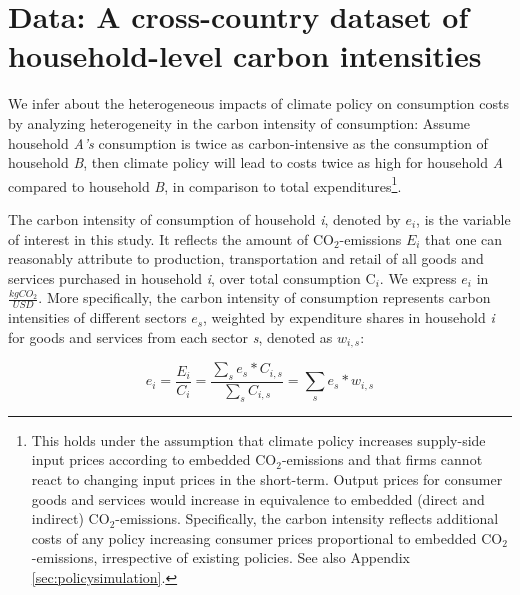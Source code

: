 \documentclass[12pt, a4paper]{article}
\begin{document}
\section{Data: A cross-country dataset of household-level carbon intensities} \label{sec:data}

We infer about the heterogeneous impacts of climate policy on consumption costs by analyzing heterogeneity in the carbon intensity of consumption: Assume household \textit{A's} consumption is twice as carbon-intensive as the consumption of household \textit{B}, then climate policy will lead to costs twice as high for household \textit{A} compared to household \textit{B}, in comparison to total expenditures\footnote{This holds under the assumption that climate policy increases supply-side input prices according to embedded CO$_{2}$-emissions and that firms cannot react to changing input prices in the short-term. Output prices for consumer goods and services would increase in equivalence to embedded (direct and indirect) CO$_{2}$-emissions. Specifically, the carbon intensity reflects additional costs of any policy increasing consumer prices proportional to embedded CO$_{2}$-emissions, irrespective of existing policies. See also Appendix \ref{sec:policysimulation}.}.

The carbon intensity of consumption of household \textit{i}, denoted by $e_{i}$, is the variable of interest in this study. It reflects the amount of CO$_{2}$-emissions $E_{i}$ that one can reasonably attribute to production, transportation and retail of all goods and services purchased in household \textit{i}, over total consumption C$_{i}$. We express $e_{i}$ in $\frac{kgCO_{2}}{USD}$. More specifically, the carbon intensity of consumption represents carbon intensities of different sectors $e_{s}$, weighted by expenditure shares in household \textit{i} for goods and services from each sector \textit{s}, denoted as $w_{i,s}$:


\begin{equation} \label{eq:ei}
e_{i} = \frac{E_{i}}{C_{i}} = \frac{\sum_{s} e_{s}*C_{i,s}}{\sum_{s} C_{i,s}} = \sum_{s} e_{s}*w_{i,s}
\end{equation}

\end{document}
